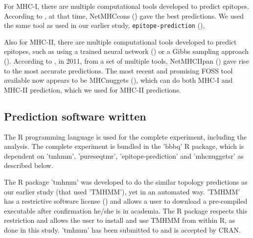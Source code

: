 
For MHC-I, there are multiple computational tools developed 
to predict epitopes. 
According to \cite{lundegaard2011prediction}, at that time,
NetMHCcons (\cite{karosiene2012netmhccons}) gave the best predictions.
We used the same tool as used in our earlier study, \verb;epitope-prediction; (\cite{bianchi2017}),


Also for MHC-II, there are multiple computational tools developed 
to predict epitopes,
such as using a trained neural network (\cite{nielsen2003reliable})
or a Gibbs sampling approach (\cite{nielsen2004improved}).
According to \cite{lundegaard2011prediction}, in 2011,
from a set of multiple tools, 
NetMHCIIpan (\cite{nielsen2008quantitative,karosiene2013netmhciipan})
gave rise to the most accurate predictions.
The most recent and promising FOSS tool available now appears
to be MHCnuggets (\cite{shao2020high}), which can do both MHC-I 
and MHC-II prediction, which we used for MHC-II predictions.

\subsection{Prediction software written}


The R programming language is used for the complete 
experiment, including the analysis.
The complete experiment is bundled in the 'bbbq' R package,
which is dependent on 'tmhmm', 'pureseqtmr', 
'epitope-prediction' and 'mhcnuggetsr'
as described below.


The R package 'tmhmm' was developed to do the similar topology
predictions as our earlier study (that used 'TMHMM'), yet in an automated way.
'TMHMM' has a restrictive software license (\cite{krogh2001predicting}) and allows a user
to download a pre-compiled executable after confirmation he/she
is in academia. The R package respects this restriction
and allows the user to install and use TMHMM from within R,
as done in this study.
'tmhmm' has been submitted to and is accepted by CRAN.

